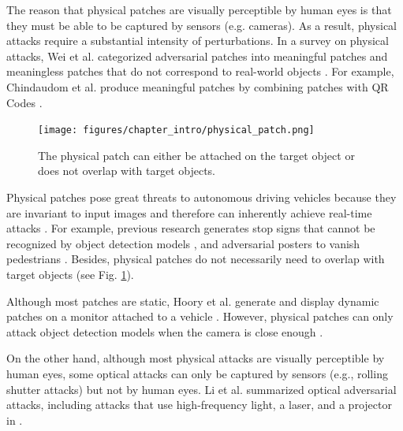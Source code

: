 The reason that physical patches are visually perceptible by human eyes is that they must be able to be captured by sensors (e.g. cameras). As a result, physical attacks require a substantial intensity of perturbations. In a survey on physical attacks, Wei et al. categorized adversarial patches into meaningful patches and meaningless patches that do not correspond to real-world objects \citep{wei2023visually}. For example, Chindaudom et al. produce meaningful patches by combining patches with QR Codes \citep{chindaudom2020adversarialqr, chindaudom2022surreptitious}. 

\begin{figure}[H]
\centering
\texttt{[image: figures/chapter\_intro/physical\_patch.png]}
\caption{The physical patch can either be attached on the target object or does not overlap with target objects.}
\label{fig.physical_patch_overlap}
\end{figure}

Physical patches pose great threats to autonomous driving vehicles because they are invariant to input images and therefore can inherently achieve real-time attacks \citep{threet2021physical}. For example, previous research generates stop signs that cannot be recognized by object detection models \citep{song2018physical} \citep{chen2019shapeshifter}, and adversarial posters to vanish pedestrians \citep{thys2019fooling, wang2021towards}. Besides, physical patches do not necessarily need to overlap with target objects (see Fig. \ref{fig.physical_patch_overlap}).

Although most patches are static, Hoory et al. generate and display dynamic patches on a monitor attached to a vehicle \citep{hoory2020dynamic}. However, physical patches can only attack object detection models when the camera is close enough \citep{wang2021daedalus, lu2021scale}.

On the other hand, although most physical attacks are visually perceptible by human eyes, some optical attacks can only be captured by sensors (e.g., rolling shutter attacks) but not by human eyes. Li et al. summarized optical adversarial attacks, including attacks that use high-frequency light, a laser, and a projector in \citep{li2022survey}.


